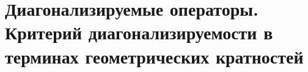 \section{Диагонализируемые операторы. Критерий диагонализируемости в терминах геометрических кратностей}
